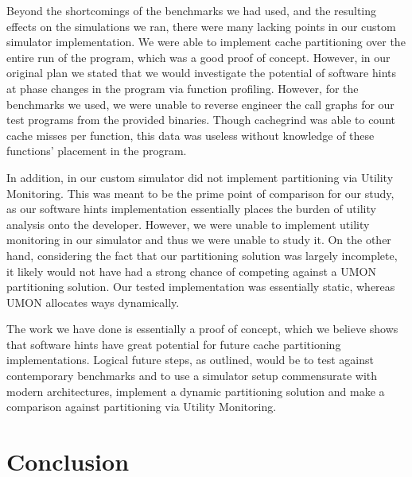 \documentclass{acm_proc_article-sp}
\begin{document}
Beyond the shortcomings of the benchmarks we had used, and the resulting effects on the simulations we ran, there were many lacking points in our custom simulator implementation. We were able to implement cache partitioning over the entire run of the program, which was a good proof of concept. However, in our original plan we stated that we would investigate the potential of software hints at phase changes in the program via function profiling. However, for the benchmarks we used, we were unable to reverse engineer the call graphs for our test programs from the provided binaries. Though cachegrind was able to count cache misses per function, this data was useless without knowledge of these functions’ placement in the program.
 
In addition, in our custom simulator did not implement partitioning via Utility Monitoring. This was meant to be the prime point of comparison for our study, as our software hints implementation essentially places the burden of utility analysis onto the developer.  However, we were unable to implement utility monitoring in our simulator and thus we were unable to study it. On the other hand, considering the fact that our partitioning solution was largely incomplete, it likely would not have had a strong chance of competing against a UMON partitioning solution. Our tested implementation was essentially static, whereas UMON allocates ways dynamically.
 
The work we have done is essentially a proof of concept, which we believe shows that software hints have great potential for future cache partitioning implementations. Logical future steps, as outlined, would be to test against contemporary benchmarks and to use a simulator setup commensurate with modern architectures, implement a dynamic partitioning solution and make a comparison against partitioning via Utility Monitoring.

\section{Conclusion}
\end{document}
